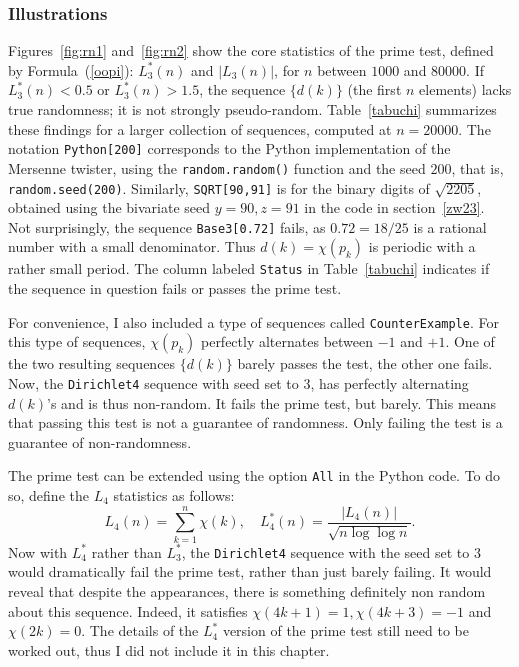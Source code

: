 \documentclass[oneside,10pt]{book}
\begin{document}
\subsubsection{Illustrations}

Figures~\ref{fig:rn1} and~\ref{fig:rn2} show the core statistics of the prime test,
 defined by Formula~(\ref{oopi}): $L^*_3(n)$ and $|L_3(n)|$, for $n$ between
 $\num{1000}$ and $\num{80000}$.  If $L^*_3(n)<0.5$ or $L^*_3(n)>1.5$, the sequence $\{d(k)\}$ (the first $n$ elements) lacks true randomness; it is not 
 \textcolor{index}{strongly pseudo-random}. Table~\ref{tabuchi} summarizes these findings for a larger collection of sequences, 
 computed at $n=\num{20000}$.
  The notation \texttt{Python[200]} corresponds to the Python implementation 
 of the Mersenne twister, using the \texttt{random.random()} function and the seed $200$, that is, \texttt{random.seed(200)}. 
 Similarly, \texttt{SQRT[90,91]} is for the binary digits of $\sqrt{2205}$, obtained using the bivariate seed $y=90, z=91$ in the code in section~\ref{zw23}. Not surprisingly, the sequence \texttt{Base3[0.72]} fails, as $0.72=18/25$ is a rational number with a small denominator. 
 Thus $d(k)=\chi(p_k)$ is periodic with a rather small period. The column labeled \texttt{Status} in Table~\ref{tabuchi} indicates if the sequence in question fails or passes the prime test.



For convenience, I also included a type of sequences called \texttt{CounterExample}. For this type of sequences, $\chi(p_k)$ perfectly alternates between $-1$ and $+1$. One of the two resulting sequences $\{d(k)\}$ barely passes the test, the other one fails.
Now, the \texttt{Dirichlet4} sequence with seed set to $3$, has perfectly alternating $d(k)$'s and is thus non-random.  It fails the prime test, but barely.
This  means that passing this test is not a guarantee of randomness. Only failing the test is a guarantee of non-randomness. 
 

The prime test can be extended using the option \texttt{All} in the Python code. To do so, define the $L_4$ statistics as follows:
\begin{equation}
L_4(n)=\sum_{k=1}^n \chi(k), \quad L^*_4(n)=\frac{|L_4(n)|}{\sqrt{n\log\log n}}.\label{l4}
\end{equation}
Now with $L^*_4$ rather than $L^*_3$, the \texttt{Dirichlet4} sequence with the seed set to $3$ would dramatically fail the prime test,
 rather than just barely failing. It would reveal that despite the appearances, there is something definitely non random about this sequence. Indeed, it satisfies 
$\chi(4k+1)=1, \chi(4k+3)=-1$ and $\chi(2k)=0$.  The details of the $L^*_4$ version of the prime test still need to be worked out, thus I did not include it in this chapter. 
\end{document}
